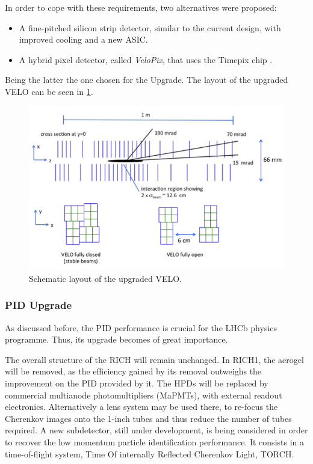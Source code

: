 In order to cope with these requirements, two alternatives were  proposed:
\begin{itemize} 
\item A fine-pitched silicon strip detector, similar to the current design, with improved cooling and a new ASIC.
\item A hybrid pixel detector, called \textit{VeloPix}, that uses the Timepix chip . 
\end{itemize}
Being the latter the one chosen for the Upgrade. The layout of the upgraded VELO can be seen in \ref{fig:VELOUPGRADE}. 


\begin{figure} [htb!]
\begin{center}
\includegraphics[scale=0.7]{figs/VELO_Upgrade.png}
\caption{Schematic layout of the upgraded VELO.\label{fig:VELOUPGRADE}}
\end{center}
\end{figure}
 
\subsubsection{PID Upgrade}

As discussed before, the PID performance is crucial for the LHCb physics programme. Thus, its upgrade becomes of great importance. 

The overall structure of the RICH will remain unchanged. In RICH1, the aerogel will be removed, as the efficiency gained by its removal outweighs the improvement on the PID provided by it. The HPDs will be replaced by commercial multianode photomultipliers (MaPMTs), with external readout electronics. Alternatively a lens system may be used there, to re-focus the Cherenkov images onto the 1-inch tubes and thus reduce the number of tubes required. A new subdetector, still under development, is being considered in order to recover the low momentum particle identification performance. It consists in a time-of-flight system, Time Of internally Reflected Cherenkov Light, TORCH. 

